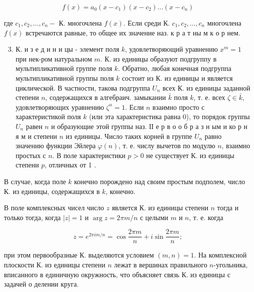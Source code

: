 \documentclass[10pt]{article}
\begin{document}
\[

f(x)=a_{0}\left(x-c_{1}\right)\left(x-c_{2}\right) \ldots\left(x-c_{n}\right)

\]



где $c_{1}, c_{2}, \ldots, c_{n}-$ К. многочлена $f(x)$. Если среди К. $c_{1}, c_{2}, \ldots, c_{n}$ многочлена $f(x)$ встречаются равные, то общее их значение наз. к р а т ны м к о р нем.



\begin{enumerate}

  \setcounter{enumi}{2}

  \item К. и з е д и н и цы - элемент поля $k$, удовлетворяющий уравнению $x^{m}=1$ при нек-ром натуральном $m$. К. из единицы образуют подгруппу в мультипликативной группе поля $k$. Обратно, любая конечная подгруппа мультипликативной группы поля $k$ состоит из К. из единицы и является циклической. В частности, такова подгруппа $U_{n}$ всех $К$. из единицы заданной степени $n$, содержащихся в алгебраич. замыкании $\bar{k}$ поля $k$, т. е. всех $\zeta \in \bar{k}$, удовлетворяющих уравнению $\zeta^{n}=1$. Если $n$ взаимно просто с характеристикой поля $k$ (или эта характеристика равна 0), то порядок группы $U_{n}$ равен $n$ и образующие этой группы наз. ІІ е р в о о б р а з н ым и ко р н я м и степени $n$ из единицы. Число таких корней в группе $U_{n}$ равно значению функции Эйлера $\varphi(n)$, т. е. числу вычетов по модулю $n$, взаимно простых с $n$. В поле характеристики $p>0$ не существует К. из единицы степени $p$, отличных от 1 .

\end{enumerate}



В случае, когда поле $k$ конечно порождено над своим простым подполем, число К. из единицы, содержащихся в $k$, конечно.



В поле комплексных чисел число $z$ является $К$. из единицы степени $n$ тогда и только тогда, когда $|z|=1$ и $\arg z=2 \pi m / n$ с целыми $m$ и $n$, т. е. когда



\[

z=e^{2 \pi i m / n}=\cos \frac{2 \pi m}{n}+i \sin \frac{2 \pi m}{n} ;

\]



при этом первообразные К. выделяются условием $(m, n)=1$. На комплексной плоскости К. из единицы степени $n$ лежат в вершинах правильного $n$-угольника, вписанного в единичную окружность, что объясняет связь К. из единицы с задачей о делении круга.
\end{document}
